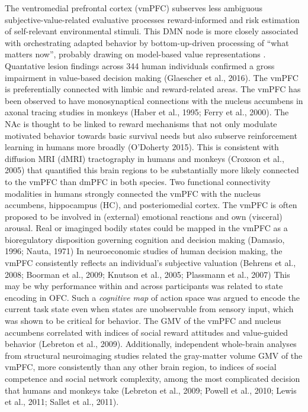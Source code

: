 \documentclass{article} %
\begin{document}
The ventromedial prefrontal cortex (vmPFC) subserves
less ambiguous subjective-value-related evaluative processes
reward-informed and risk estimation of self-relevant environmental stimuli.
This DMN node is more closely associated with
orchestrating adapted behavior by bottom-up-driven
processing of “what matters now”,
probably drawing on model-based value representations
\citep{doherty2015structure}.
Quantative lesion findings across 344 human individuals confirmed
a gross impairment in value-based decision making
(Glaescher et al., 2016).
The vmPFC is preferentially connected with limbic and reward-related areas.
The vmPFC has been observed to have monosynaptical connections
with the nucleus accumbens
in axonal tracing studies in monkeys (Haber et al., 1995; Ferry et al., 2000).
The NAc is thought to be linked to reward mechanisms that not
only modulate motivated behavior towards basic survival needs but also
subserve reinforcement learning in humans more broadly
(O'Doherty 2015).
This is consistent with diffusion MRI (dMRI) tractography in humans and monkeys
(Croxson et al., 2005) that
quantified this brain regions to
be substantially more likely connected to the vmPFC than dmPFC in both species.
Two functional connectivity modalities in humans strongly connected
the vmPFC with the nucleus accumbens, hippocampus (HC),
and posteriomedial cortex.
%
The vmPFC is often proposed to be involved in (external) emotional
reactions and own (visceral) arousal.
Real or imaginged bodily states could be mapped in the vmPFC
as a bioregulatory disposition governing cognition
and decision making (Damasio, 1996; Nauta, 1971)
In neuroeconomic studies of human decision making,
the vmPFC consistently reflects an individual’s subjective
valuation (Behrens et al., 2008; Boorman et al., 2009; Knutson et al., 2005; Plassmann et al., 2007)
This may be why performance within and across participants
was related to state encoding in OFC.
Such a \textit{cognitive map} of action space was argued to encode
the current task state even when states are unobservable from sensory input,
which was shown to be critical for behavior.
The GMV of the vmPFC and nucleus accumbens
correlated with indices of social reward attitudes and
value-guided behavior (Lebreton et al., 2009).
Additionally,
independent whole-brain analyses from structural
neuroimaging studies related the gray-matter volume GMV of the vmPFC,
more consistently than any other
brain region, to indices of
social competence and social network complexity,
among the most complicated decision that humans and monkeys take
(Lebreton et al., 2009; Powell et al., 2010; Lewis et al., 2011; Sallet et al., 2011).
%
\end{document}

